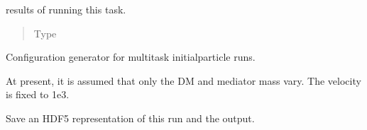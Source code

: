 \documentclass[letterpaper,10pt,english]{sphinxmanual}
\begin{document}
\begin{fulllineitems}
\begin{fulllineitems}
\begin{quote}
\begin{description}
\end{description}\end{quote}

\end{fulllineitems}


\begin{fulllineitems}
\label{\detokenize{interface:scdc.interface.EnsembleTask.result}}
results of running this task.
\begin{quote}\begin{description}
\item[{Type}] \leavevmode
{}

\end{description}\end{quote}

\end{fulllineitems}


\end{fulllineitems}


\begin{fulllineitems}
\label{\detokenize{interface:scdc.interface.InitialConfiguration}}
Configuration generator for multi\sphinxhyphen{}task initial\sphinxhyphen{}particle runs.

At present, it is assumed that only the DM and mediator mass vary. The
velocity is fixed to 1e\sphinxhyphen{}3.

\begin{fulllineitems}
\label{\detokenize{interface:scdc.interface.InitialConfiguration.save}}
Save an HDF5 representation of this run and the output.

\end{fulllineitems}


\end{fulllineitems}
\end{document}
